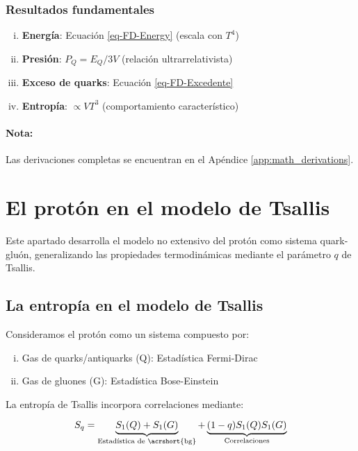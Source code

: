 \subsubsection*{Resultados fundamentales}
\begin{enumerate}[i.]
    \item \textbf{Energía}: Ecuación \eqref{eq-FD-Energy} (escala con $T^4$)
    \item \textbf{Presión}: $P_Q = E_Q/3V$ (relación ultrarrelativista)
    \item \textbf{Exceso de quarks}: Ecuación \eqref{eq-FD-Excedente}
    \item \textbf{Entropía}: $\propto V T^3$ (comportamiento característico)
\end{enumerate}

\paragraph{Nota:} Las derivaciones completas se encuentran en el Apéndice \ref{app:math_derivations}.

\section{El protón en el modelo de Tsallis}

Este apartado desarrolla el modelo no extensivo del protón como sistema quark-gluón, generalizando las propiedades termodinámicas mediante el parámetro $q$ de Tsallis.

\subsection{La entropía en el modelo de Tsallis}

Consideramos el protón como un sistema compuesto por:

\begin{enumerate}[i.]
    \item Gas de quarks/antiquarks (Q): Estadística Fermi-Dirac
    \item Gas de gluones (G): Estadística Bose-Einstein
\end{enumerate}

La entropía de Tsallis incorpora correlaciones mediante:

\begin{equation}\label{eq-Entropy-Tsallis}
{S}_{q} = \underbrace{{S}_{1}(Q) + {S}_{1}(G)}_{\text{Estadística de \acrshort{bg}}} + \underbrace{(1-q){S}_{1}(Q){S}_{1}(G)}_{\text{Correlaciones}}
\end{equation}

